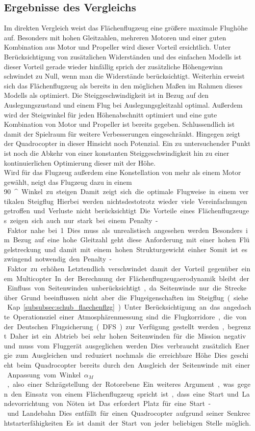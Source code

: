 \subsection{Ergebnisse des Vergleichs} 
Im direkten Vergleich weist das Flächenflugzeug eine größere maximale Flughöhe auf. Besonders mit hohen Gleitzahlen, mehreren Motoren und einer guten Kombination aus Motor und Propeller wird dieser Vorteil ersichtlich. Unter Berücksichtigung von zusätzlichen Widerständen und des einfachen Modells ist dieser Vorteil gerade wieder hinfällig sprich der zusätzliche Höhengewinn schwindet zu Null, wenn man die Widerstände berücksichtigt. Weiterhin erweist sich das Flächenflugzeug als bereits in den möglichen Maßen im Rahmen dieses Modells als optimiert. Die Steiggeschwindigkeit ist in Bezug auf den Auslegungszustand und einem Flug bei Auslegungsgleitzahl optimal. Außerdem wird der Steigwinkel für jeden Höhenabschnitt optimiert und eine gute Kombination von Motor und Propeller ist bereits gegeben. Schlussendlich ist damit der Spielraum für weitere Verbesserungen eingeschränkt. Hingegen zeigt der Quadrocopter in dieser Hinsicht noch Potenzial. Ein zu untersuchender Punkt ist noch die Abkehr von einer konstanten Steiggeschwindigkeit hin zu einer kontinuierlichen Optimierung dieser mit der Höhe. \\
Wird für das Flugzeug außerdem eine Konstellation von mehr als einem Motor gewählt, neigt das Flugzeug dazu in einem \SI{90}{^\circ} Winkel zu steigen. Damit zeigt sich die optimale Flugweise in einem vertikalen Steigflug. Hierbei werden nichtsdestotrotz wieder viele Vereinfachungen getroffen und Verluste nicht berücksichtigt. Die Vorteile eines Flächenflugzeuges zeigen sich auch nur stark bei einem Penalty-Faktor nahe bei 1. Dies muss als unrealistisch angesehen werden. Besonders im Bezug auf eine hohe Gleitzahl geht diese Anforderung mit einer hohen Flügelstreckung und damit mit einem hohen Strukturgewicht einher. Somit ist es zwingend notwendig den Penalty-Faktor zu erhöhen. Letztendlich verschwindet damit der Vorteil gegenüber einem Multicopter. 
In der Berechnung der Flächenflugzeugaerodynamik bleibt der Einfluss von Seitenwinden unberücksichtigt, da Seitenwinde nur die Strecke über Grund beeinflussen nicht aber die Flugeigenschaften im Steigflug (siehe Kap. \ref{subsubsec:schub_flaechenflzg}). Unter Berücksichtigung an das angedachte Operationsziel einer Atmosphärenmessung sind die Flugkorridore, die von der Deutschen Flugsicherung (DFS) zur Verfügung gestellt werden, begrenzt. Daher ist ein Abtrieb bei sehr hohen Seitenwinden für die Mission negativ und muss vom Fluggerät ausgeglichen werden. Dies verbraucht zusätzlich Energie zum Ausgleichen und reduziert nochmals die erreichbare Höhe. Dies geschieht beim Quadrocopter bereits durch den Ausgleich der Seitenwinde mit einer Anpassung vom Winkel \ensuremath{\alpha_{M}}, also einer Schrägstellung der Rotorebene. Ein weiteres Argument, was gegen den Einsatz von einem Flächenflugzeug spricht ist, dass eine Start und Landevorrichtung von Nöten ist. Das erfordert Platz für eine Start- und Landebahn. Dies entfällt für einen Quadrocopter aufgrund seiner Senkrechtstarterfähigkeiten. Es ist damit der Start von jeder beliebigen Stelle möglich.
